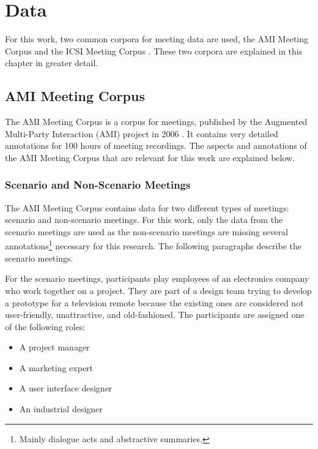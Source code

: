 \chapter{Data}\label{ch:data}

For this work, two common corpora for meeting data are used, the AMI Meeting Corpus \cite{Mccowan05theami} and the ICSI Meeting Corpus \cite{Janin}.
These two corpora are explained in this chapter in greater detail.


\section{AMI Meeting Corpus}\label{sec:ami-meeting-corpus}

The AMI Meeting Corpus is a corpus for meetings, published by the Augmented Multi-Party Interaction (AMI) project in 2006 \cite{Mccowan05theami}.
It contains very detailed annotations for 100 hours of meeting recordings.
The aspects and annotations of the AMI Meeting Corpus that are relevant for this work are explained below.

\subsection{Scenario and Non-Scenario Meetings}

The AMI Meeting Corpus contains data for two different types of meetings: scenario and non-scenario meetings.
For this work, only the data from the scenario meetings are used as the non-scenario meetings are missing several annotations\footnote{Mainly dialogue acts and abstractive summaries.} necessary for this research.
The following paragraphs describe the scenario meetings.

For the scenario meetings, participants play employees of an electronics company who work together on a project.
They are part of a design team trying to develop a prototype for a television remote because the existing ones are considered not user-friendly, unattractive, and old-fashioned.
The participants are assigned one of the following roles:
\begin{itemize}
\item A project manager
\item A marketing expert
\item A user interface designer
\item An industrial designer
\end{itemize}

